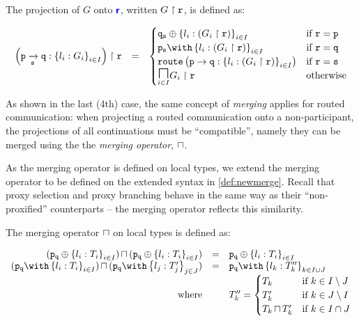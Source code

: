\begin{definition}[Projection]
The projection of $G$ onto ${\color{blue}\bm{\mathsf{r}}}$,
written ${G} \upharpoonright {\mathtt{r}}$, is defined as:

\doublespacing
\[
\begin{array}{>{\displaystyle}rc>{\displaystyle}l}

\proj{
\left(\groute{p}{q}{s}{l_i: G_i}{i \in I}\right)
}{r} & = & 
\begin{cases}
\tselproxy{q}{s}{l_i: (\proj{G_i}{r})}{i \in I}
	& \text{if} ~ \mrole{r} = \mrole{p} \\
\tbraproxy{p}{s}{l_i: (\proj{G_i}{r})}{i \in I}
	& \text{if} ~ \mrole{r} = \mrole{q} \\
\router{p}{q}{l_i: (\proj{G_i}{r})}{i \in I}
	& \text{if} ~ \mrole{r} = \mrole{s} \\
\underset{i \in I}{\MERGEOP}\proj{G_i}{r}
	& \text{otherwise} \\
\end{cases}
\\

\end{array}
\]
\singlespacing

\label{def:newprojection}
\end{definition}

As shown in the last (4th) case, 
the same concept of \textit{merging}
applies for routed communication:
when projecting a routed communication
onto a non-participant, the projections of
all continuations must be ``compatible'',
namely they can be merged using the
the \textit{merging operator}, $\sqcap$.

As the merging operator is defined on local
types, we extend the merging operator to be defined
on the extended syntax in \cref{def:newmerge}.
Recall that proxy selection and proxy
branching behave in the same way as their ``non-proxified''
counterparts -- the merging operator reflects this
similarity.

\begin{definition}
The merging operator $\sqcap$ on local types
is defined as:

\doublespacing
\[
\begin{array}{rcl}
\tmerge
{(\tselproxy{p}{q}{l_i: T_i}{i \in I})}
{(\tselproxy{p}{q}{l_i: T_i}{i \in I})}
	& = & \tselproxy{p}{q}{l_i: T_i}{i \in I} \\
	
\tmerge
{(\tbraproxy{p}{q}{l_i: T_i}{i \in I})}
{(\tbraproxy{p}{q}{l_j: T'_j}{j \in J})}
	& = & \tbraproxy{p}{q}{l_k: T''_k}{k \in I \cup J} \\
\text{where} & & T''_k = \begin{cases}
T_k & \text{if} ~ k \in I \setminus J \\
T'_k & \text{if} ~ k \in J \setminus I \\
\tmerge{T_k}{T'_k} & \text{if} ~ k \in I \cap J \\
\end{cases} \\
\end{array}
\]
\singlespacing

\label{def:newmerge}
\end{definition}


